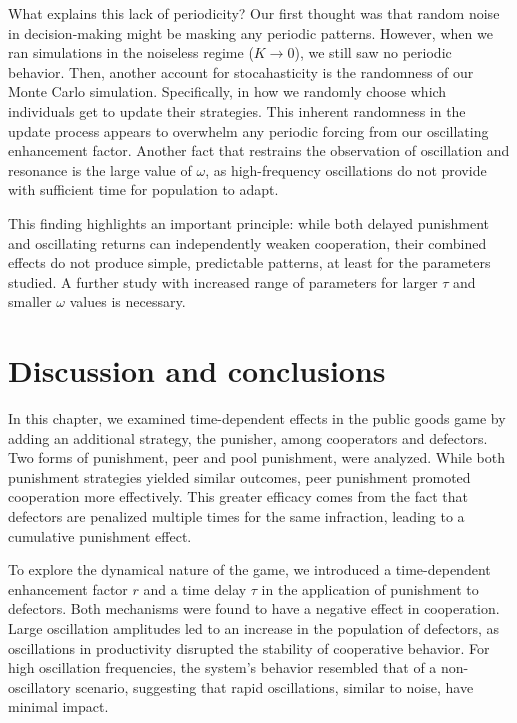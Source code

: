 What explains this lack of periodicity? Our first thought was that random noise in decision-making might be masking any periodic patterns. However, when we ran simulations in the noiseless regime ($K \to 0$), we still saw no periodic behavior. Then, another account for stocahasticity is the randomness of our Monte Carlo simulation. Specifically, in how we randomly choose which individuals get to update their strategies. This inherent randomness in the update process appears to overwhelm any periodic forcing from our oscillating enhancement factor. Another fact that restrains the observation of oscillation and resonance is the large value of $\omega$, as high-frequency oscillations do not provide with sufficient time for population to adapt. 

This finding highlights an important principle: while both delayed punishment and oscillating returns can independently weaken cooperation, their combined effects do not produce simple, predictable patterns, at least for the parameters studied. A further study with increased range of parameters for larger $\tau$ and smaller $\omega$ values is necessary.




\section{Discussion and conclusions}
\label{3Conclusions}


In this chapter, we examined time-dependent effects in the public goods game by adding an additional strategy, the punisher, among cooperators and defectors. Two forms of punishment, peer and pool punishment, were analyzed. While both punishment strategies yielded similar outcomes, peer punishment promoted cooperation more effectively. This greater efficacy comes from the fact that defectors are penalized multiple times for the same infraction, leading to a cumulative punishment effect.

To explore the dynamical nature of the game, we introduced a time-dependent enhancement factor $r$ and a time delay $\tau$ in the application of punishment to defectors. Both mechanisms were found to have a negative effect in cooperation. Large oscillation amplitudes led to an increase in the population of defectors, as oscillations in productivity disrupted the stability of cooperative behavior. For high oscillation frequencies, the system's behavior resembled that of a non-oscillatory scenario, suggesting that rapid oscillations, similar to noise, have minimal impact.

